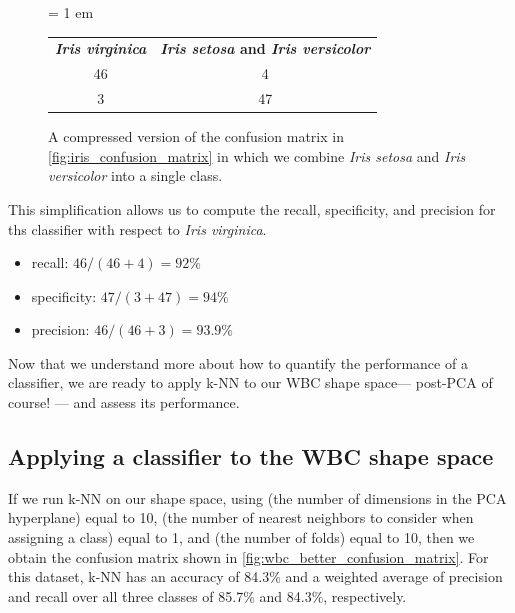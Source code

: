  \begin{figure}[h]
\centering
\tabcolsep = 1 em
\mySfFamily
\begin{tabular}{c c}
\textbf{\textit{Iris virginica}} & \textbf{\textit{Iris setosa} and \textit{Iris versicolor}} \\
46 & 4 \\
3 & 47 \\
\end{tabular}
\caption{A compressed version of the confusion matrix in \autoref{fig:iris_confusion_matrix} in which we combine \textit{Iris setosa} and \textit{Iris versicolor} into a single class.}
\label{fig:iris_confusion_matrix_compressed}
\end{figure}

This simplification allows us to compute the recall, specificity, and precision for ths classifier with respect to \textit{Iris virginica}.

\begin{itemize}
\item recall: $46/(46+4) = 92\%$
\item specificity: $47/(3+47) = 94\%$
\item precision: $46/(46+3) = 93.9\%$
\end{itemize}

\fudgespace

\begin{qbox}\end{qbox}

Now that we understand more about how to quantify the performance of a classifier, we are ready to apply k-NN to our WBC shape space --- post-PCA of course! --- and assess its performance.

\FloatBarrier
{}
\subsection{Applying a classifier to the WBC shape space}

If we run k-NN on our shape space, using  (the number of dimensions in the PCA hyperplane) equal to 10,  (the number of nearest neighbors to consider when assigning a class) equal to 1, and  (the number of folds) equal to 10, then we obtain the confusion matrix shown in \autoref{fig:wbc_better_confusion_matrix}. For this dataset, k-NN has an accuracy of 84.3\% and a weighted average of precision and recall over all three classes of 85.7\% and 84.3\%, respectively.\\

